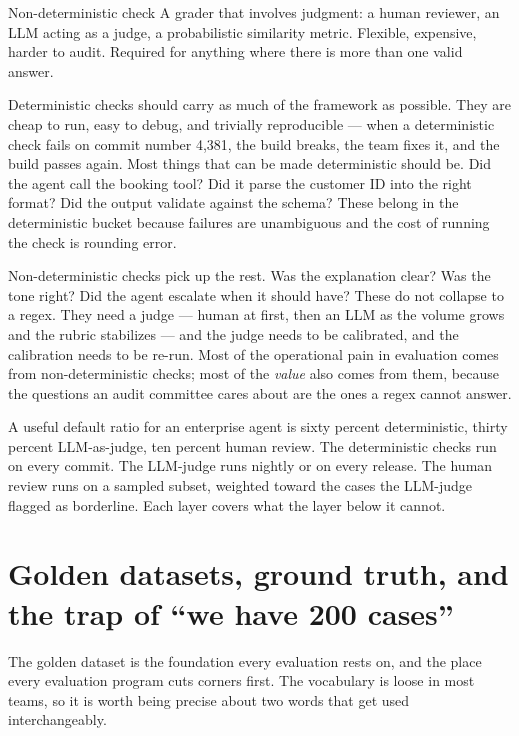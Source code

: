 \begin{TNdefinition}{Non-deterministic check}
A grader that involves judgment: a human reviewer, an LLM acting as a judge, a probabilistic similarity metric. Flexible, expensive, harder to audit. Required for anything where there is more than one valid answer.
\end{TNdefinition}

Deterministic checks should carry as much of the framework as possible. They are cheap to run, easy to debug, and trivially reproducible --- when a deterministic check fails on commit number 4,381, the build breaks, the team fixes it, and the build passes again. Most things that can be made deterministic should be. Did the agent call the booking tool? Did it parse the customer ID into the right format? Did the output validate against the schema? These belong in the deterministic bucket because failures are unambiguous and the cost of running the check is rounding error.

Non-deterministic checks pick up the rest. Was the explanation clear? Was the tone right? Did the agent escalate when it should have? These do not collapse to a regex. They need a judge --- human at first, then an LLM as the volume grows and the rubric stabilizes --- and the judge needs to be calibrated, and the calibration needs to be re-run. Most of the operational pain in evaluation comes from non-deterministic checks; most of the \textit{value} also comes from them, because the questions an audit committee cares about are the ones a regex cannot answer.

A useful default ratio for an enterprise agent is sixty percent deterministic, thirty percent LLM-as-judge, ten percent human review. The deterministic checks run on every commit. The LLM-judge runs nightly or on every release. The human review runs on a sampled subset, weighted toward the cases the LLM-judge flagged as borderline. Each layer covers what the layer below it cannot.

\section{Golden datasets, ground truth, and the trap of ``we have 200 cases''}

The golden dataset is the foundation every evaluation rests on, and the place every evaluation program cuts corners first. The vocabulary is loose in most teams, so it is worth being precise about two words that get used interchangeably.

